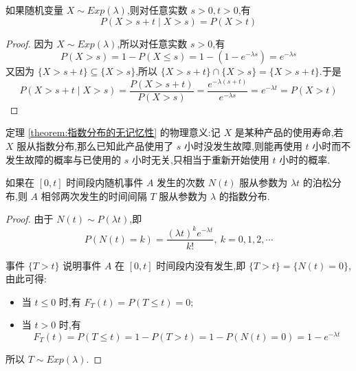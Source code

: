 \begin{theorem}
    \indent 如果随机变量 $X \sim Exp(\lambda)$,则对任意实数 $s>0, t>0$,有
    \begin{equation}
        P(X > s+t \mid X>s) = P(X>t)
    \end{equation}
\end{theorem}

\begin{proof}
    因为 $X \sim Exp(\lambda)$,所以对任意实数 $s>0$,有
    $$
    P(X>s) = 1 - P(X \leqslant s) = 1 - (1 - e^{-\lambda s}) = e^{-\lambda s}
    $$
    又因为 $\{ X > s+t \} \subseteq \{ X>s \}$,所以 $\{ X > s+t \} \cap \{ X>s \} = \{ X > s+t \}$.于是
    $$
    P(X > s+t \mid X>s) = \dfrac{P(X > s+t)}{P(X>s)} = \dfrac{e^{-\lambda (s+t)}}{e^{-\lambda s}} = e^{-\lambda t} = P(X > t)
    $$

    \vspace{-2em}
\end{proof}

\begin{note}
    \indent 定理 \ref{theorem:指数分布的无记忆性} 的物理意义:记 $X$ 是某种产品的使用寿命,若 $X$ 服从指数分布,那么已知此产品使用了 $s$ 小时没发生故障,则能再使用 $t$ 小时而不发生故障的概率与已使用的 $s$ 小时无关,只相当于重新开始使用 $t$ 小时的概率.
\end{note}

\begin{conclusion}[][泊松分布与指数分布的关系]
    \indent 如果在 $[0,t]$ 时间段内随机事件 $A$ 发生的次数 $N(t)$ 服从参数为 $\lambda t$ 的泊松分布,则 $A$ 相邻两次发生的时间间隔 $T$ 服从参数为 $\lambda$ 的指数分布.
\end{conclusion}

\begin{proof}
    由于 $N(t) \sim P(\lambda t)$,即
    $$
    P(N(t) = k) = \dfrac{(\lambda t)^k e^{- \lambda t}}{k!},\ k=0,1,2,\cdots
    $$

    事件 $\{ T > t \}$ 说明事件 $A$ 在 $[0,t]$ 时间段内没有发生,即 $\{ T > t \} = \{ N(t) = 0 \}$,由此可得:
    \begin{itemize}
        \item 当 $t \leqslant 0$ 时,有 $F_T(t) = P(T \leqslant t) = 0$;
        \item 当 $t > 0$ 时,有
        $$
        F_T(t) = P(T \leqslant t) = 1 - P(T>t) = 1 - P(N(t) = 0) = 1 - e^{-\lambda t}
        $$
    \end{itemize}
    所以 $T \sim Exp(\lambda)$.
\end{proof}


